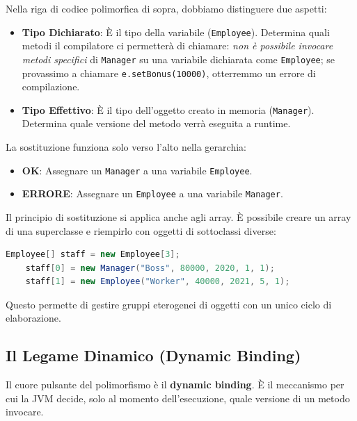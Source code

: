 Nella riga di codice polimorfica di sopra, dobbiamo distinguere due aspetti:
\begin{itemize}
    \item \textbf{Tipo Dichiarato}: È il tipo della variabile (\texttt{Employee}). Determina quali metodi il compilatore ci permetterà di chiamare: \textit{non è possibile invocare metodi specifici} di \texttt{Manager} su una variabile dichiarata come \texttt{Employee}; se provassimo a chiamare \texttt{e.setBonus(10000)}, otterremmo un errore di compilazione.
    \item \textbf{Tipo Effettivo}: È il tipo dell'oggetto creato in memoria (\texttt{Manager}). Determina quale versione del metodo verrà eseguita a runtime.
\end{itemize}



\begin{warningbox}
    La sostituzione funziona solo verso l'alto nella gerarchia:
    \begin{itemize}
        \item \textbf{OK}: Assegnare un \texttt{Manager} a una variabile \texttt{Employee}.
        \item \textbf{ERRORE}: Assegnare un \texttt{Employee} a una variabile \texttt{Manager}.
    \end{itemize}
\end{warningbox}

\begin{observation}
    Il principio di sostituzione si applica anche agli array. È possibile creare un array di una superclasse e riempirlo con oggetti di sottoclassi diverse:
    \begin{lstlisting}[language=Java]
    Employee[] staff = new Employee[3];
    staff[0] = new Manager("Boss", 80000, 2020, 1, 1);
    staff[1] = new Employee("Worker", 40000, 2021, 5, 1);
    \end{lstlisting}
    Questo permette di gestire gruppi eterogenei di oggetti con un unico ciclo di elaborazione.
\end{observation}

\subsection{Il Legame Dinamico (Dynamic Binding)}

Il cuore pulsante del polimorfismo è il \textbf{dynamic binding}. È il meccanismo per cui la JVM decide, solo al momento dell'esecuzione, quale versione di un metodo invocare.

